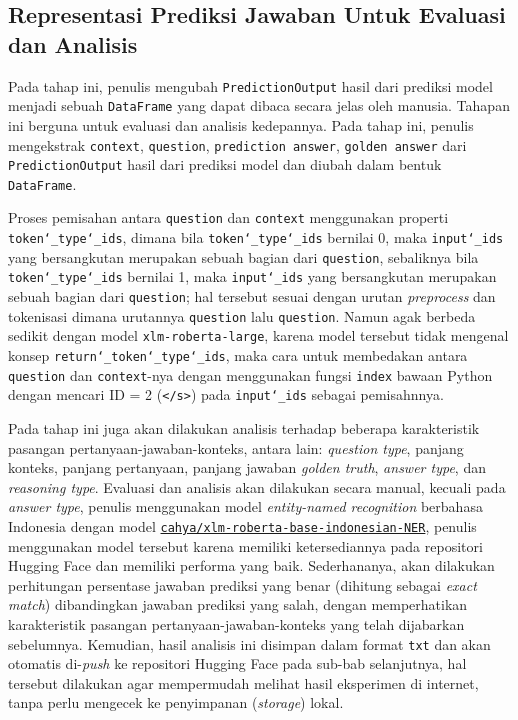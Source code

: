 \subsection{Representasi Prediksi Jawaban Untuk Evaluasi dan Analisis}
\label{4.2.10}
Pada tahap ini, penulis mengubah \texttt{PredictionOutput} hasil dari prediksi model menjadi sebuah \texttt{DataFrame} yang dapat dibaca secara jelas oleh manusia. Tahapan ini berguna untuk evaluasi dan analisis kedepannya. Pada tahap ini, penulis mengekstrak \texttt{context}, \texttt{question}, \texttt{prediction answer}, \texttt{golden answer} dari \texttt{PredictionOutput} hasil dari prediksi model dan diubah dalam bentuk \texttt{DataFrame}. 

Proses pemisahan antara \texttt{question} dan \texttt{context} menggunakan properti \texttt{token\char`_type\char`_ids}, dimana bila \texttt{token\char`_type\char`_ids} bernilai 0, maka \texttt{input\char`_ids} yang bersangkutan merupakan sebuah bagian dari \texttt{question}, sebaliknya bila \texttt{token\char`_type\char`_ids} bernilai 1, maka \texttt{input\char`_ids} yang bersangkutan merupakan sebuah bagian dari \texttt{question}; hal tersebut sesuai dengan urutan \emph{preprocess} dan tokenisasi dimana urutannya \texttt{question} lalu \texttt{question}. Namun agak berbeda sedikit dengan model \texttt{xlm-roberta-large}, karena model tersebut tidak mengenal konsep \texttt{return\char`_token\char`_type\char`_ids}, maka cara untuk membedakan antara \texttt{question} dan \texttt{context}-nya dengan menggunakan fungsi \texttt{index} bawaan Python dengan mencari ID = 2 (\texttt{</s>}) pada \texttt{input\char`_ids} sebagai pemisahnnya. 

Pada tahap ini juga akan dilakukan analisis terhadap beberapa karakteristik pasangan pertanyaan-jawaban-konteks, antara lain: \emph{question type}, panjang konteks, panjang pertanyaan, panjang jawaban \emph{golden truth}, \emph{answer type}, dan \emph{reasoning type}. Evaluasi dan analisis akan dilakukan secara manual, kecuali pada \emph{answer type}, penulis menggunakan model \emph{entity-named recognition} berbahasa Indonesia dengan model \href{https://huggingface.co/cahya/xlm-roberta-base-indonesian-NER}{\texttt{cahya/xlm-roberta-base-indonesian-NER}}, penulis menggunakan model tersebut karena memiliki ketersediannya pada repositori Hugging Face dan memiliki performa yang baik. Sederhananya, akan dilakukan perhitungan persentase jawaban prediksi yang benar (dihitung sebagai \emph{exact match}) dibandingkan jawaban prediksi yang salah, dengan memperhatikan karakteristik pasangan pertanyaan-jawaban-konteks yang telah dijabarkan sebelumnya. Kemudian, hasil analisis ini disimpan dalam format \texttt{txt} dan akan otomatis di-\emph{push} ke repositori Hugging Face pada sub-bab selanjutnya, hal tersebut dilakukan agar mempermudah melihat hasil eksperimen di internet, tanpa perlu mengecek ke penyimpanan (\emph{storage}) lokal.

